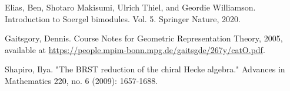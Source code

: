 \begin{thebibliography}{Yau}

	
	
	 Elias, Ben, Shotaro Makisumi, Ulrich Thiel, and Geordie Williamson. Introduction to Soergel bimodules. Vol. 5. Springer Nature, 2020.

	 Gaitsgory, Dennis. Course Notes for Geometric Representation Theory, 2005, available at \url{https://people.mpim-bonn.mpg.de/gaitsgde/267y/catO.pdf}.

	 Shapiro, Ilya. "The BRST reduction of the chiral Hecke algebra." Advances in Mathematics 220, no. 6 (2009): 1657-1688.

\end{thebibliography}


 


